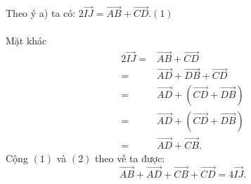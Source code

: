 \begin{bt}
{\begin{listEX}
			\item Theo ý a) ta có: $2\overrightarrow{IJ} = \overrightarrow{AB} + \overrightarrow{CD}$.\hfill$(1)$\\\\
			Mặt khác
			{\allowdisplaybreaks
				\begin{align*}
					2\overrightarrow{IJ} =& \overrightarrow{AB} + \overrightarrow{CD}\\
					=&\overrightarrow{AD} + \overrightarrow{DB} + \overrightarrow{CD}\\
					=&\overrightarrow{AD} + (\overrightarrow{CD} + \overrightarrow{DB})\\
					=&\overrightarrow{AD} + (\overrightarrow{CD} + \overrightarrow{DB})\\
					=&\overrightarrow{AD} + \overrightarrow{CB}.\tag{2}
			\end{align*}}
			Cộng $(1)$ và $(2)$ theo vế ta được:
			\[\overrightarrow{AB} + \overrightarrow{AD} + \overrightarrow{CB} + \overrightarrow{CD}= 4\overrightarrow{IJ}.\]
		\end{listEX}
	}
\end{bt}

